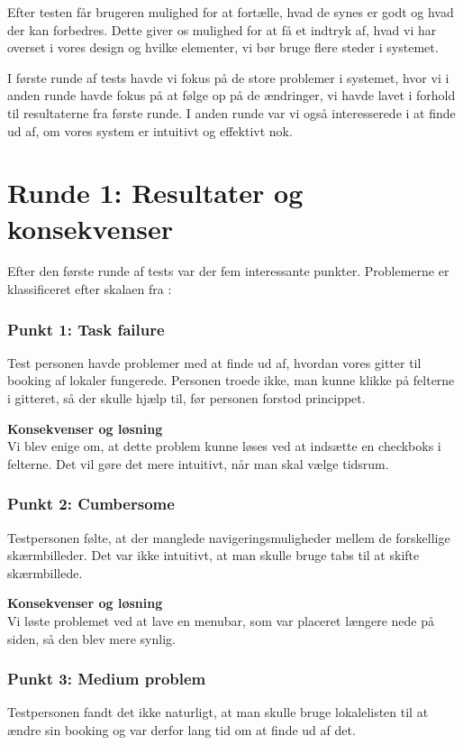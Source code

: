 Efter testen får brugeren mulighed for at fortælle, hvad de synes er godt og hvad der kan forbedres. Dette giver os mulighed for at få et indtryk af, hvad vi har overset i vores design og hvilke elementer, vi bør bruge flere steder i systemet.

I første runde af tests havde vi fokus på de store problemer i systemet, hvor vi i anden runde havde fokus på at følge op på de ændringer, vi havde lavet i forhold til resultaterne fra første runde. I anden runde var vi også interesserede i at finde ud af, om vores system er intuitivt og effektivt nok.

\section{Runde 1: Resultater og konsekvenser}
\label{Usability_R1}
Efter den første runde af tests var der fem interessante punkter. Problemerne er klassificeret efter skalaen fra \cite[s. 439]{SL_UID}:

\subsubsection*{Punkt 1: Task failure}
Test personen havde problemer med at finde ud af, hvordan vores gitter til booking af lokaler fungerede. Personen troede ikke, man kunne klikke på felterne i gitteret, så der skulle hjælp til, før personen forstod princippet.

\textbf{Konsekvenser og løsning}
\\Vi blev enige om, at dette problem kunne løses ved at indsætte en checkboks i felterne. Det vil gøre det mere intuitivt, når man skal vælge tidsrum.

\subsubsection*{Punkt 2: Cumbersome}
Testpersonen følte, at der manglede navigeringsmuligheder mellem de forskellige skærmbilleder. Det var ikke intuitivt, at man skulle bruge tabs til at skifte skærmbillede.

\textbf{Konsekvenser og løsning}
\\Vi løste problemet ved at lave en menubar, som var placeret længere nede på siden, så den blev mere synlig.

\subsubsection*{Punkt 3: Medium problem}
Testpersonen fandt det ikke naturligt, at man skulle bruge lokalelisten til at ændre sin booking og var derfor lang tid om at finde ud af det.

